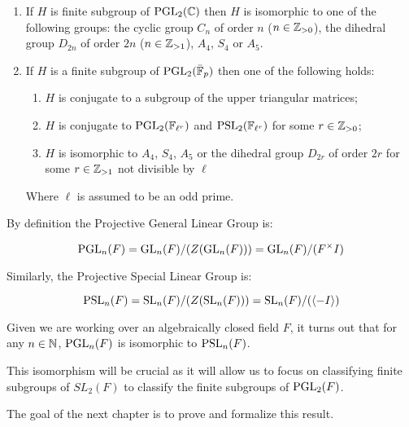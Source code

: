 \begin{enumerate}
    \item If $H$ is finite subgroup of $\operatorname{PGL}_2(\mathbb{C})$ then $H$ is isomorphic to one of the following groups: the cyclic group $C_n$ of order $n$ ($n \in \mathbb{Z}_{>0}$), the dihedral group $D_{2n}$ of order $2n$ ($n \in \mathbb{Z}_{>1}$), $A_4$, $S_4$ or $A_5$.
\item If $H$ is a finite subgroup of $\operatorname{PGL}_2(\bar{\mathbb{F}}_p)$ then one of the following holds:
\begin{enumerate}
    \item $H$ is conjugate to a subgroup of the upper triangular matrices;
    \item $H$ is conjugate to $\operatorname{PGL}_2(\mathbb{F}_{\ell^r})$ and $\operatorname{PSL}_2(\mathbb{F}_{\ell^{r}})$ for some $r \in \mathbb{Z}_{>0}$;
    \item $H$ is isomorphic to $A_4$, $S_4$, $A_5$ or the dihedral group $D_{2r}$ of order $2r$ for some $r \in \mathbb{Z}_{>1}$ not divisible by $\ell$

\end{enumerate}
    Where $\ell$ is assumed to be an odd prime.
\end{enumerate}


By definition the Projective General Linear Group is:

\begin{equation}
    \operatorname{PGL}_n(F) = \operatorname{GL}_n(F) / (Z(\operatorname{GL}_n(F))) = \operatorname{GL}_n(F) / (F^\times I) 
\end{equation}

Similarly, the Projective Special Linear Group is:

\begin{equation}
    \operatorname{PSL}_n(F) = \operatorname{SL}_n(F) / (Z(\operatorname{SL}_n(F))) = \operatorname{SL}_n(F) / (\langle -I\rangle)
\end{equation}

Given we are working over an algebraically closed field $F$, it turns out that for any $n \in \mathbb{N}$, $\operatorname{PGL}_n(F)$ is isomorphic to $\operatorname{PSL}_n(F)$.

This isomorphism will be crucial as it will allow us to focus on classifying finite subgroups of $SL_2(F)$ to classify the finite subgroups of $\operatorname{PGL}_2(F)$.

The goal of the next chapter is to prove and formalize this result.